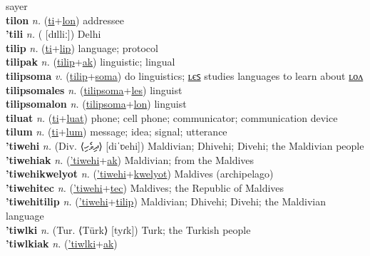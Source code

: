 sayer \label{tiles} \\
\textbf{tilon} \textit{n.} (\hyperref[ti]{ti}+\hyperref[lon]{lon})
addressee \label{tilon} \\
\textbf{'tili} \textit{n.} ( [dɪlliː])
Delhi \label{'tili} \\
\textbf{tilip} \textit{n.} (\hyperref[ti]{ti}+\hyperref[lip]{lip})
language; protocol \label{tilip} \\
\textbf{tilipak} \textit{n.} (\hyperref[tilip]{tilip}+\hyperref[ak]{ak})
linguistic; lingual \label{tilipak} \\
\textbf{tilipsoma} \textit{v.} (\hyperref[tilip]{tilip}+\hyperref[soma]{soma})
do linguistics; \hyperref[tilipsomales]{ʟєꜱ} studies languages to learn about \hyperref[tilipsomalon]{ʟᴏᴧ} \label{tilipsoma} \\
\textbf{tilipsomales} \textit{n.} (\hyperref[tilipsoma]{tilipsoma}+\hyperref[les]{les})
linguist \label{tilipsomales} \\
\textbf{tilipsomalon} \textit{n.} (\hyperref[tilipsoma]{tilipsoma}+\hyperref[lon]{lon})
linguist \label{tilipsomalon} \\
\textbf{tiluat} \textit{n.} (\hyperref[ti]{ti}+\hyperref[luat]{luat})
phone; cell phone; communicator; communication device \label{tiluat} \\
\textbf{tilum} \textit{n.} (\hyperref[ti]{ti}+\hyperref[lum]{lum})
message; idea; signal; utterance \label{tilum} \\
\textbf{'tiwehi} \textit{n.} (Div. ⟨ދިވެހި⟩ [diˈʋehi])
Maldivian; Dhivehi; Divehi; the Maldivian people \label{'tiwehi} \\
\textbf{'tiwehiak} \textit{n.} (\hyperref['tiwehi]{'tiwehi}+\hyperref[ak]{ak})
Maldivian; from the Maldives \label{'tiwehiak} \\
\textbf{'tiwehikwelyot} \textit{n.} (\hyperref['tiwehi]{'tiwehi}+\hyperref[kwelyot]{kwelyot})
Maldives (archipelago) \label{'tiwehikwelyot} \\
\textbf{'tiwehitec} \textit{n.} (\hyperref['tiwehi]{'tiwehi}+\hyperref[tec]{tec})
Maldives; the Republic of Maldives \label{'tiwehitec} \\
\textbf{'tiwehitilip} \textit{n.} (\hyperref['tiwehi]{'tiwehi}+\hyperref[tilip]{tilip})
Maldivian; Dhivehi; Divehi; the Maldivian language \label{'tiwehitilip} \\
\textbf{'tiwlki} \textit{n.} (Tur. ⟨Türk⟩ [tyɾk])
Turk; the Turkish people \label{'tiwlki} \\
\textbf{'tiwlkiak} \textit{n.} (\hyperref['tiwlki]{'tiwlki}+\hyperref[ak]{ak})
